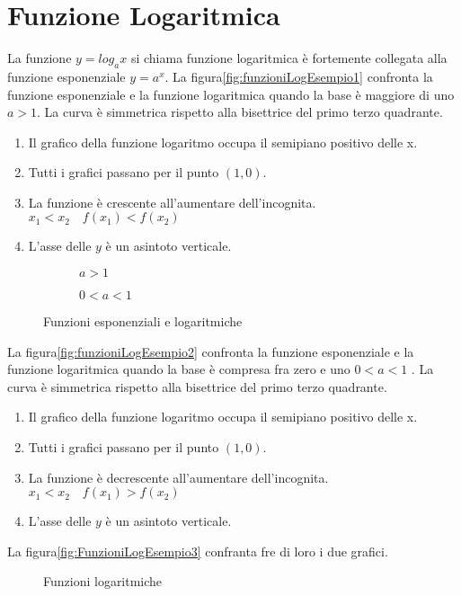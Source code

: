 \section{Funzione Logaritmica}
\label{FunzioneLogaritmica}
La funzione $y=log_ax$ si chiama funzione logaritmica è fortemente collegata alla funzione esponenziale $y=a^x$. La figura\nobs\vref{fig:funzioniLogEsempio1} confronta la funzione esponenziale e la funzione logaritmica  quando la base è maggiore di uno $a>1$. La curva è simmetrica rispetto alla bisettrice del primo terzo quadrante. 
\begin{enumerate}
	\item Il grafico della funzione logaritmo occupa il semipiano positivo delle x.
	\item Tutti i grafici passano per il punto $(1,0)$.
	\item La funzione è crescente all'aumentare dell'incognita. $x_1<x_2\quad f(x_1)<f(x_2)$ 
	\item L'asse delle $y$ è un asintoto verticale.
\end{enumerate} 
\begin{figure}
	\centering
	\begin{subfigure}[b]{.4\linewidth}
		\centering
	
		\caption{$a>1$}
		\label{fig:funzioniLogEsempio1}
	\end{subfigure}\qquad
	\centering
	\begin{subfigure}[b]{.4\linewidth}
		\centering
	
		\caption{$0<a<1$}
		\label{fig:funzioniLogEsempio2}
	\end{subfigure}%
	\caption{Funzioni esponenziali e logaritmiche}
	\label{fig:funzExp1}
\end{figure}
La figura\nobs\vref{fig:funzioniLogEsempio2} confronta la funzione esponenziale e la funzione logaritmica  quando la base è compresa fra zero e uno $0<a<1$ . La curva è simmetrica rispetto alla bisettrice del primo terzo quadrante. 
\begin{enumerate}
	\item Il grafico della funzione logaritmo occupa il semipiano positivo delle x.
	\item Tutti i grafici passano per il punto $(1,0)$.
	\item La funzione è decrescente all'aumentare dell'incognita. $x_1<x_2\quad f(x_1)>f(x_2)$ 
	\item L'asse delle $y$ è un asintoto verticale.
\end{enumerate}
La figura\nobs\vref{fig:FunzioniLogEsempio3} confranta fre di loro i due grafici.
\begin{figure}
\centering

\caption{Funzioni logaritmiche}
\label{fig:FunzioniLogEsempio3}
\end{figure}
